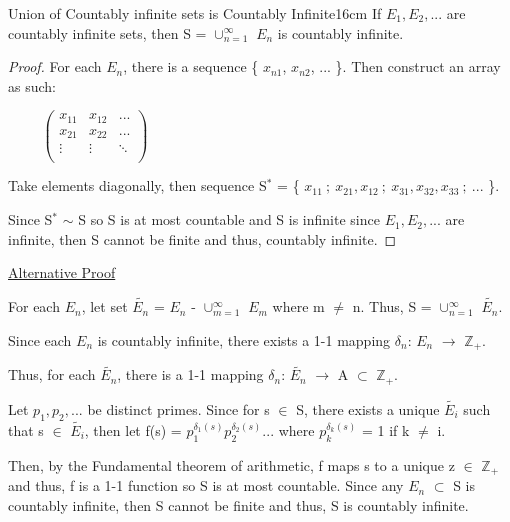 	\begin{wtheorem}{Union of Countably infinite sets is Countably Infinite}{16cm}
		If $E_1, E_2, ... $ are countably infinite sets, then S = $\cup_{n=1}^{\infty}$ $E_n$
		is countably infinite.		
	\end{wtheorem}
	
	\begin{proof}
		For each $E_n$, there is a sequence \{ $x_{n1}$, $x_{n2}$, ... \}.
		Then construct an array as such:

		{\small $ \hspace{1cm}
		\left(
		\begin{array}{ccc}
			x_{11} & x_{12} & ... \\
			x_{21} & x_{22} & ... \\
			\vdots & \vdots & \ddots \\
		\end{array}
		\right)
		$}
			
		Take elements diagonally, then sequence S$^*$ =
		\{ $x_{11} \ ; \ x_{21}, x_{12} \ ; \ x_{31}, x_{32}, x_{33} \ ; \ ... $ \}.
			
		Since S$^*$ $\sim$ S so S is at most countable and S is infinite since
		$E_1, E_2, ...$ are infinite, then S cannot be finite and
		thus, countably infinite.
	\end{proof}

	\vspace{0.1cm}

	{ \color{magenta} \underline{Alternative Proof} }

	\begin{tbox}
		For each $E_n$, let set $\widetilde{E_n}$ = $E_n$ - $\cup_{m=1}^{\infty}$
		$E_m$ where m $\neq$ n. Thus, S = $\cup_{n=1}^{\infty}$ $\widetilde{E_n}$.

		Since each $E_n$ is countably infinite, there exists a 1-1 mapping
		$\delta_n$: $E_n$ $\rightarrow$ $\mathbb{Z}_+$.

		Thus, for each $\widetilde{E_n}$, there is a 1-1 mapping
		$\delta_n$: $\widetilde{E_n}$ $\rightarrow$ A $\subset$ $\mathbb{Z}_+$.

		Let $p_1, p_2, ... $ be distinct primes.
		Since for s $\in$ S, there exists a unique $\widetilde{E_i}$ such that
		s $\in$ $\widetilde{E_i}$, then let f(s) = $p_1^{\delta_1(s)}
		p_2^{\delta_2(s)}...$ where $p_k^{\delta_k(s)}$ = 1 if k $\neq$ i.

		Then, by the Fundamental theorem of arithmetic, f maps s to a unique
		z $\in$ $\mathbb{Z}_+$ and thus, f is a 1-1 function so S is at most countable.
		Since any $E_n$ $\subset$ S is countably infinite, then S cannot be finite
		and thus, S is countably infinite.
	\end{tbox}



